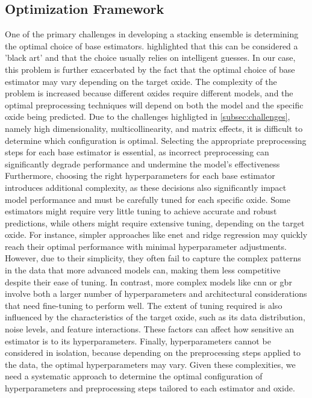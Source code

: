 \subsection{Optimization Framework}\label{sec:optimization_framework}
One of the primary challenges in developing a stacking ensemble is determining the optimal choice of base estimators. \citet{wolpertstacked_1992} highlighted that this can be considered a 'black art' and that the choice usually relies on intelligent guesses. 
In our case, this problem is further exacerbated by the fact that the optimal choice of base estimator may vary depending on the target oxide. 
The complexity of the problem is increased because different oxides require different models, and the optimal preprocessing techniques will depend on both the model and the specific oxide being predicted. 
Due to the challenges highligted in \ref{subsec:challenges}, namely high dimensionality, multicollinearity, and matrix effects, it is difficult to determine which configuration is optimal.
Selecting the appropriate preprocessing steps for each base estimator is essential, as incorrect preprocessing can significantly degrade performance and undermine the model's effectiveness
Furthermore, choosing the right hyperparameters for each base estimator introduces additional complexity, as these decisions also significantly impact model performance and must be carefully tuned for each specific oxide. 
Some estimators might require very little tuning to achieve accurate and robust predictions, while others might require extensive tuning, depending on the target oxide. 
For instance, simpler approaches like \gls{enet} and ridge regression may quickly reach their optimal performance with minimal hyperparameter adjustments. However, due to their simplicity, they often fail to capture the complex patterns in the data that more advanced models can, making them less competitive despite their ease of tuning.
In contrast, more complex models like \gls{cnn} or \gls{gbr} involve both a larger number of hyperparameters and architectural considerations that need fine-tuning to perform well.
The extent of tuning required is also influenced by the characteristics of the target oxide, such as its data distribution, noise levels, and feature interactions. 
These factors can affect how sensitive an estimator is to its hyperparameters.
Finally, hyperparameters cannot be considered in isolation, because depending on the preprocessing steps applied to the data, the optimal hyperparameters may vary.
Given these complexities, we need a systematic approach to determine the optimal configuration of hyperparameters and preprocessing steps tailored to each estimator and oxide.

